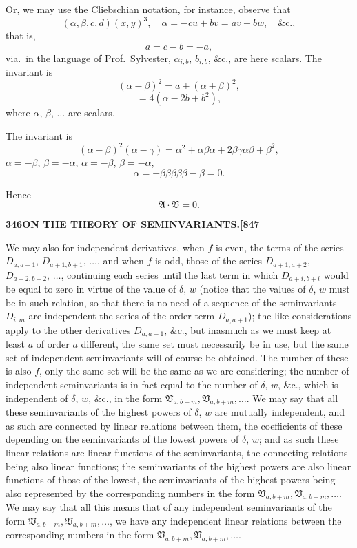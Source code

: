 \documentclass[12pt,a4paper]{article}
\theoremstyle{definition}
\begin{document}
Or, we may use the Cliebschian notation, for instance, observe that
\[
(\alpha, \beta, c, d)(x, y)^3, \quad \alpha = -cu + bv = av + bw, \quad \&\text{c.},
\]
that is,
\[
a = c - b = -a,
\]
via.\ in the language of Prof.\ Sylvester, $\alpha_{i,b}$, $b_{i,b}$, $\&\text{c.}$, are here scalars. The invariant is
\[
(\alpha - \beta)^2 = a + (\alpha + \beta)^2,
\]
\[
= 4(\alpha - 2b + b^2),
\]
where $\alpha$, $\beta$, $\ldots$ are scalars.

The invariant is
\[
(\alpha - \beta)^2(\alpha - \gamma) = \alpha^2 + \alpha\beta\alpha + 2\beta\gamma\alpha\beta + \beta^2,
\]
$\alpha = -\beta$, $\beta = -\alpha$, $\alpha = -\beta$, $\beta = -\alpha$,
\[
\alpha = -\beta\beta\beta\beta\beta - \beta = 0.
\]

Hence
\[
\mathfrak{A} \cdot \mathfrak{V} = 0.
\]

\newpage
\setcounter{page}{346}

\noindent\textbf{346}\hfill\textbf{ON THE THEORY OF SEMINVARIANTS.}\hfill\textbf{[847}

\bigskip

\noindent We may also for independent derivatives, when $f$ is even, the terms of the series $D_{a,a+1}$, $D_{a+1,b+1}$, $\ldots$, and when $f$ is odd, those of the series $D_{a+1,a+2}$, $D_{a+2,b+2}$, $\ldots$, continuing each series until the last term in which $D_{a+i,b+i}$ would be equal to zero in virtue of the value of $\delta$, $w$ (notice that the values of $\delta$, $w$ must be in such relation, so that there is no need of a sequence of the seminvariants $D_{i,m}$ are independent the series of the order term $D_{a,a+1}$); the like considerations apply to the other derivatives $D_{a,a+1}$, $\&\text{c.}$, but inasmuch as we must keep at least $a$ of order $a$ different, the same set must necessarily be in use, but the same set of independent seminvariants will of course be obtained. The number of these is also $f$, only the same set will be the same as we are considering; the number of independent seminvariants is in fact equal to the number of $\delta$, $w$, $\&\text{c.}$, which is independent of $\delta$, $w$, $\&\text{c.}$, in the form $\mathfrak{V}_{a,b+m}, \mathfrak{V}_{a,b+m}, \ldots$. We may say that all these seminvariants of the highest powers of $\delta$, $w$ are mutually independent, and as such are connected by linear relations between them, the coefficients of these depending on the seminvariants of the lowest powers of $\delta$, $w$; and as such these linear relations are linear functions of the seminvariants, the connecting relations being also linear functions; the seminvariants of the highest powers are also linear functions of those of the lowest, the seminvariants of the highest powers being also represented by the corresponding numbers in the form $\mathfrak{V}_{a,b+m}, \mathfrak{V}_{a,b+m}, \ldots$. We may say that all this means that of any independent seminvariants of the form $\mathfrak{V}_{a,b+m}, \mathfrak{V}_{a,b+m}, \ldots$, we have any independent linear relations between the corresponding numbers in the form $\mathfrak{V}_{a,b+m}, \mathfrak{V}_{a,b+m}, \ldots$.
\end{document}
